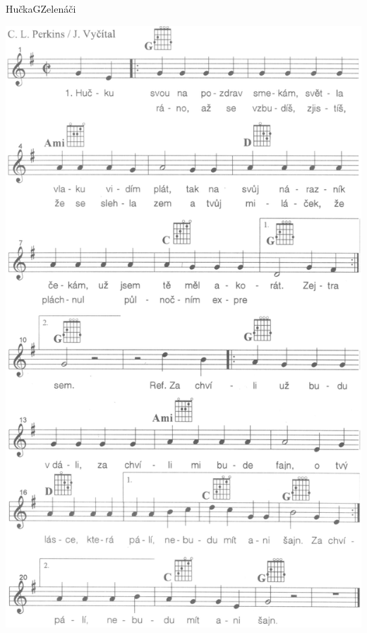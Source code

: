 \setcounter{page}{32}
\begin{song}{Hučka}{G}{Zelenáči}
\begin{center}
\includegraphics[height=0.9\textheight]{noty/a_hučka} 
\end{center}
\end{song} \pagebreak
